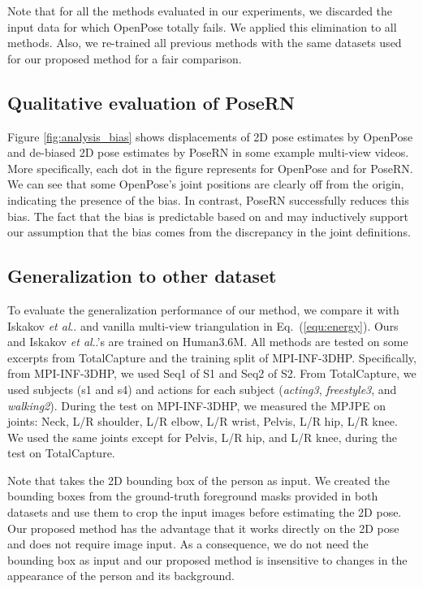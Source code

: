 \documentclass{article}
\makeatletter
\DeclareRobustCommand\onedot{\futurelet\@let@token\@onedot}
\def\@onedot{\ifx\@let@token.\else.\null\fi\xspace}
\def\etal{\emph{et al}\onedot}
\makeatother
\begin{document}
Note that for all the methods evaluated in our experiments, we discarded the input data for which OpenPose totally fails.
We applied this elimination to all methods. Also, we re-trained all previous methods with the same datasets used for our proposed method for a fair comparison.  

\vspace{-0.2cm}
\subsection{Qualitative evaluation of PoseRN}
\vspace{-0.1cm}
Figure \ref{fig:analysis_bias} shows displacements of 2D pose estimates by OpenPose and de-biased 2D pose estimates by PoseRN in some example multi-view videos. More specifically, each dot in the figure represents  for OpenPose and  for PoseRN. We can see that some OpenPose's joint positions are clearly off from the origin, indicating the presence of the bias. In contrast, PoseRN successfully reduces this bias. The fact that the bias is predictable based on  and  may inductively support our assumption that the bias comes from the discrepancy in the joint definitions. 

\vspace{-0.2cm}
\subsection{Generalization to other dataset}\label{sec:exp_other_dataset}
\vspace{-0.1cm}
To evaluate the generalization performance of our method, we compare it with Iskakov \etal \cite{iskakov2019learnable} and vanilla multi-view triangulation in Eq.~(\ref{equ:energy}). Ours and Iskakov \etal's are trained on Human3.6M. All methods are tested on some excerpts from TotalCapture and the training split of MPI-INF-3DHP. Specifically, from MPI-INF-3DHP, we used Seq1 of S1 and Seq2 of S2.
From TotalCapture, we used  subjects (s1 and s4) and  actions for each subject (\textit{acting3}, \textit{freestyle3}, and \textit{walking2}). During the test on MPI-INF-3DHP, we measured the MPJPE on  joints: Neck, L/R shoulder, L/R elbow, L/R wrist, Pelvis, L/R hip, L/R knee. We used the same joints except for Pelvis, L/R hip, and L/R knee, during the test on TotalCapture.

Note that \cite{iskakov2019learnable} takes the 2D bounding box of the person as input. We created the bounding boxes from the ground-truth foreground masks provided in both datasets and use them to crop the input images before estimating the 2D pose. Our proposed method has the advantage that it works directly on the 2D pose and does not require image input. As a consequence, we do not need the bounding box as input and our proposed method is insensitive to changes in the appearance of the person and its background. 
\end{document}
